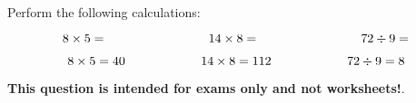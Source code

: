 

Perform the following calculations:

$$8 \times 5 = \hbox{\hskip 80pt} 14 \times 8 = \hbox{\hskip 80pt} 72 \div 9 = $$







$$8 \times 5 = 40 \hbox{\hskip 60pt} 14 \times 8 = 112 \hbox{\hskip 60pt} 72 \div 9 = 8$$







{\bf This question is intended for exams only and not worksheets!}.




